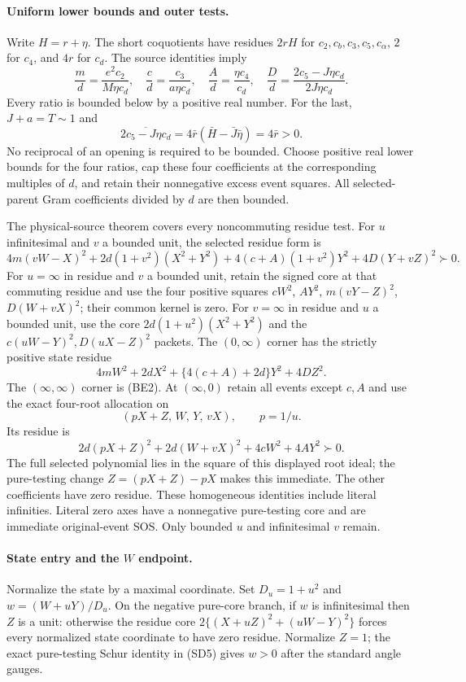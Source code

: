 \paragraph{Uniform lower bounds and outer tests.}
Write $H=r+\eta$. The short coquotients have residues $2rH$ for
$c_2,c_b,c_3,c_5,c_\alpha$, $2$ for $c_4$, and $4r$ for $c_d$.
The source identities imply
\[
 \frac md=\frac{e^2c_2}{M\eta c_d},\quad
 \frac cd=\frac{c_3}{a\eta c_d},\quad
 \frac Ad=\frac{\eta c_4}{c_d},\quad
 \frac Dd=\frac{2c_5-J\eta c_d}{2J\eta c_d}.
 \tag{BE3}
\]
Every ratio is bounded below by a positive real number. For the last,
$J+a=T\sim1$ and
\[
 \overline{2c_5-J\eta c_d}=4\bar r(\bar H-\bar J\bar\eta)
 =4\bar r>0.
\]
No reciprocal of an opening is required to be bounded. Choose positive
real lower bounds for the four ratios, cap these four coefficients at
the corresponding multiples of $d$, and retain their nonnegative
excess event squares. All selected-parent Gram coefficients divided
by $d$ are then bounded.

The physical-source theorem covers every noncommuting residue test.
For $u$ infinitesimal and $v$ a bounded unit, the selected residue form is
\[
 4m(vW-X)^2+2d(1+v^2)(X^2+Y^2)
 +4(c+A)(1+v^2)Y^2+4D(Y+vZ)^2\succ0.
\]
For $u=\infty$ in residue and $v$ a bounded unit, retain the signed
core at that commuting residue and use the four positive squares
$cW^2$, $AY^2$, $m(vY-Z)^2$, $D(W+vX)^2$; their common kernel is zero.
For $v=\infty$ in residue and $u$ a bounded unit, use the core
$2d(1+u^2)(X^2+Y^2)$ and the $c(uW-Y)^2,D(uX-Z)^2$ packets.
The $(0,\infty)$ corner has the strictly positive state residue
\[
 4mW^2+2dX^2+\{4(c+A)+2d\}Y^2+4DZ^2.
\]
The $(\infty,\infty)$ corner is (BE2).
At $(\infty,0)$ retain all events except $c,A$ and use the exact
four-root allocation on
\[
 (pX+Z,\,W,\,Y,\,vX),\qquad p=1/u.
\]
Its residue is
\[
 2d(pX+Z)^2+2d(W+vX)^2+4cW^2+4AY^2\succ0.
\]
The full selected polynomial lies in the square of this displayed
root ideal; the pure-testing change $Z=(pX+Z)-pX$ makes this immediate.
The other coefficients have zero residue. These homogeneous
identities include literal infinities. Literal zero axes have a
nonnegative pure-testing core and are immediate original-event SOS.
Only bounded $u$ and infinitesimal $v$ remain.

\paragraph{State entry and the $W$ endpoint.}
Normalize the state by a maximal coordinate. Set
$D_u=1+u^2$ and $w=(W+uY)/D_u$. On the negative pure-core branch,
if $w$ is infinitesimal then $Z$ is a unit: otherwise the residue core
$2\{(X+uZ)^2+(uW-Y)^2\}$ forces every normalized state coordinate
to have zero residue. Normalize $Z=1$; the exact pure-testing Schur
identity in (SD5) gives $w>0$ after the standard angle gauges.

